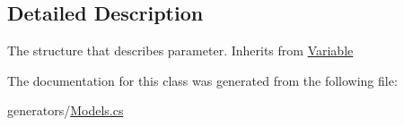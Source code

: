 \subsection{Detailed Description}
The structure that describes parameter. Inherits from \mbox{\hyperlink{classCodeGen_1_1generators_1_1Variable}{Variable}} 



The documentation for this class was generated from the following file\+:\begin{DoxyCompactItemize}
\item 
generators/\mbox{\hyperlink{Models_8cs}{Models.\+cs}}\end{DoxyCompactItemize}
